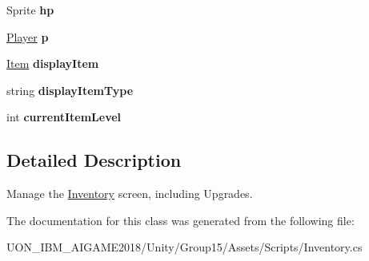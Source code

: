 \begin{DoxyCompactItemize}
\item 
\mbox{\label{class_inventory_aed66b242ae5cf8df814b5d30bf20a6b3}} 
Sprite {\bfseries hp}
\item 
\mbox{\label{class_inventory_a2b3ce9cd39d106439c316059a190782f}} 
\mbox{\hyperlink{class_player}{Player}} {\bfseries p}
\item 
\mbox{\label{class_inventory_aa1d8741824496d71e52c6f87de2c1533}} 
\mbox{\hyperlink{class_item}{Item}} {\bfseries display\+Item}
\item 
\mbox{\label{class_inventory_aeef6e41606f68069f4b44ab4a46bcc59}} 
string {\bfseries display\+Item\+Type}
\item 
\mbox{\label{class_inventory_ae1830fc12251f73f70b9d5bb7986273b}} 
int {\bfseries current\+Item\+Level}
\end{DoxyCompactItemize}


\subsection{Detailed Description}
Manage the \mbox{\hyperlink{class_inventory}{Inventory}} screen, including Upgrades. 

The documentation for this class was generated from the following file\+:\begin{DoxyCompactItemize}
\item 
U\+O\+N\+\_\+\+I\+B\+M\+\_\+\+A\+I\+G\+A\+M\+E2018/\+Unity/\+Group15/\+Assets/\+Scripts/Inventory.\+cs\end{DoxyCompactItemize}
